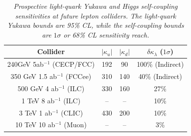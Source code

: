 \begin{table}[t!]
	\centering
	{\small
		\begin{tabular}{cccc}
			\toprule
			Collider &  $|\kappa_u|$ &  $|\kappa_d|$  & $\delta \kappa_\lambda$  ($1\sigma$) \\ \midrule
			240GeV 5ab$^{-1}$ (CECP/FCC) & 192 \cite{Gao:2016jcm}  & 90 \cite{Gao:2016jcm}   & 100\% (Indirect\cite{DiVita:2017vrr})\\
			350 GeV 1.5 ab$^{-1}$ (FCCee) & 310\cite{deBlas:2019rxi} & 140\cite{deBlas:2019rxi} &  40\% (Indirect\cite{DiVita:2017vrr})\\ 
			500 GeV 4 ab$^{-1}$ (ILC) & 330\cite{deBlas:2019rxi} & 160\cite{deBlas:2019rxi}&  27\% \cite{Bambade:2019fyw} \\
			1 TeV 8 ab$^{-1}$ (ILC) & -- & -- &  10\% \cite{deBlas:2019rxi} \\
			3 TeV 1 ab$^{-1}$ (CLIC) & 430\cite{deBlas:2019rxi} & 200\cite{deBlas:2019rxi} &  10\% \cite{deBlas:2019rxi}\\
			10 TeV 10 ab$^{-1}$ (Muon) & --& --&  3\% \cite{deBlas:2019rxi}\\ \bottomrule
		\end{tabular}
		\caption{\it Prospective light-quark Yukawa and Higgs self-coupling sensitivities at future lepton colliders. The light-quark Yukawa bounds are 95\% CL, while the self-coupling bounds are $1\sigma$ or 68\% CL sensitivity reach.}
		\label{tab:exp_yqyl}
	}
\end{table}

